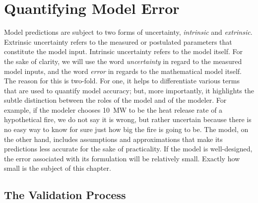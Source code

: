 
\chapter{Quantifying Model Error}

Model predictions are subject to two forms of uncertainty, {\em intrinsic} and {\em extrinsic}. Extrinsic uncertainty refers to the measured or postulated parameters that constitute the
model input. Intrinsic uncertainty refers to the model itself.
For the sake of clarity, we will use the word {\em uncertainty} in regard to the measured model inputs, and the word {\em error} in regards to the mathematical model itself. 
The reason for this is two-fold. For one,
it helps to differentiate various terms that are used to quantify model accuracy; but, more importantly, it highlights the subtle distinction between the roles of the model
and of the modeler. For example, if the modeler chooses 10~MW to be the heat release rate of a hypothetical fire, we do not say it is wrong, but rather uncertain because there
is no easy way to know for sure just how big the fire is going to be. The model, on the other hand, includes assumptions and approximations that make its predictions less
accurate for the sake of practicality. If the model is well-designed, the error associated with its formulation will be relatively small. Exactly how small is the subject of
this chapter.

\section{The Validation Process}

